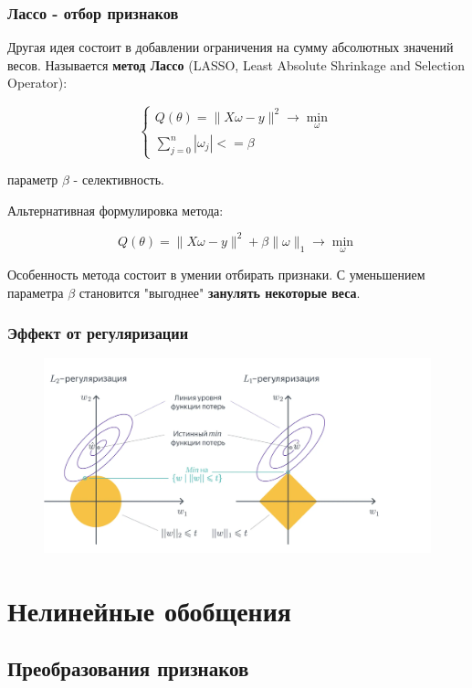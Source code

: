 \documentclass{beamer}
\begin{document}
	\begin{frame}
		\frametitle{Лассо - отбор признаков}
		Другая идея состоит в добавлении ограничения на сумму абсолютных значений весов. Называется \textbf{метод Лассо} (LASSO, Least Absolute Shrinkage and Selection Operator):
		
		\[
			\begin{cases}
				Q(\theta) = \|X\omega - y\|^{2} \rightarrow \min_{\omega}
				\\
				\sum_{j=0}^{n}|\omega_{j}| <= \beta
			\end{cases}
		\]
		
		параметр $\beta$ - селективность.
		
		
		Альтернативная формулировка метода:
		
		\[
		Q(\theta) = \|X\omega - y\|^{2} + \beta \|\omega\|_{1} \rightarrow \min_{\omega}
		\] 
		
		Особенность метода состоит в умении отбирать признаки. С уменьшением параметра $\beta$ становится "выгоднее" \textbf{занулять некоторые веса}.
	\end{frame}
	
	
	\begin{frame}
		\frametitle{Эффект от регуляризации}
		\begin{figure}[h]
			\includegraphics[width=\paperwidth, ]{img/l1_l2_regul.png}
		\end{figure}
	\end{frame}
	
	
	
	\section{Нелинейные обобщения}
	
	\subsection{Преобразования признаков}
	
\end{document}

